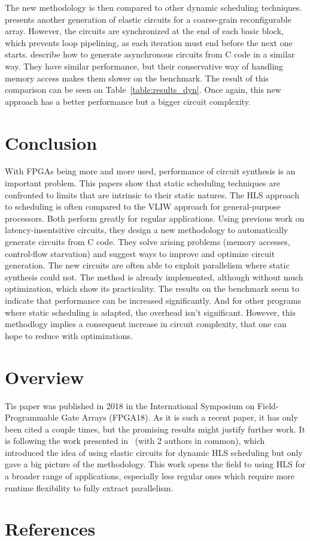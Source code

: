 \documentclass{article}
\begin{document}
The new methodology is then compared to other dynamic scheduling techniques.
\cite{DBLP:conf/fpga/HuangITCW13} presents another generation of elastic circuits for a coarse-grain reconfigurable array. However, the circuits are synchronized at the end of each basic block, which prevents loop pipelining, as each iteration must end before the next one starts.
\cite{DBLP:conf/ispass/BudiuAG05, budiu-tr02} describe how to generate asynchronous circuits from C code in a similar way. They have similar performance, but their conservative way of handling memory access makes them slower on the benchmark.
The result of this comparison can be seen on Table~\ref{table:results_dyn}. Once again, this new approach has a better performance but a bigger circuit complexity.

\section{Conclusion}
With FPGAs being more and more used, performance of circuit synthesis is an important problem.
This papers show that static scheduling techniques are confronted to limits that are intrinsic to their static natures.
The HLS approach to scheduling is often compared to the VLIW approach for general-purpose processors. Both perform greatly for regular applications.
Using previous work on latency-insentsitive circuits, they design a new methodology to automatically generate circuits from C code.
They solve arising problems (memory accesses, control-flow starvation) and suggest ways to improve and optimize circuit generation.
The new circuits are often able to exploit parallelism where static synthesis could not.
The method is already implemented, although without much optimization, which show its practicality.
The results on the benchmark seem to indicate that performance can be increased significantly. And for other programs where static scheduling is adapted, the overhead isn't significant.
However, this methodlogy implies a consequent increase in circuit complexity, that one can hope to reduce with optimizations. 

\section{Overview}
Tis paper was published in 2018 in the International Symposium on Field-Programmable Gate Arrays (FPGA18).
As it is such a recent paper, it has only been cited a couple times, but the promising results might justify further work.
It is following the work presented in~\cite{DBLP:conf/acssc/JosipovicBI17} (with 2 authors in common), which introduced the idea of using elastic circuits for dynamic HLS scheduling but only gave a big picture of the methodology.
This work opens the field to using HLS for a broader range of applications, especially less regular ones which require more runtime flexibility to fully extract parallelism.

\section{References}


\end{document}
